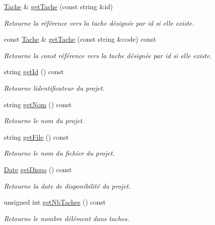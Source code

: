 \begin{DoxyCompactItemize}
\hyperlink{class_tache}{Tache} \& \hyperlink{class_projet_aec4344d230da76d5af9ad269bda21ffe}{get\+Tache} (const string \&id)
\begin{DoxyCompactList}\small\item\em Retourne la référence vers la tache désignée par id si elle existe. \end{DoxyCompactList}\item 
const \hyperlink{class_tache}{Tache} \& \hyperlink{class_projet_a99eedafc1f5a058c2d39f2e244240fa5}{get\+Tache} (const string \&code) const 
\begin{DoxyCompactList}\small\item\em Retourne la const référence vers la tache désignée par id si elle existe. \end{DoxyCompactList}\item 
string \hyperlink{class_projet_abae53a998b1d18ad7c8ea0d7221fc0eb}{get\+Id} () const 
\begin{DoxyCompactList}\small\item\em Retourne l\textquotesingle{}identificateur du projet. \end{DoxyCompactList}\item 
string \hyperlink{class_projet_abc4ef9586bab910e754d4f88943df720}{get\+Nom} () const 
\begin{DoxyCompactList}\small\item\em Retourne le nom du projet. \end{DoxyCompactList}\item 
string \hyperlink{class_projet_a9cc70cd55d62e8a2fc2d286035a599a6}{get\+File} () const 
\begin{DoxyCompactList}\small\item\em Retourne le nom du fichier du projet. \end{DoxyCompactList}\item 
\hyperlink{class_t_i_m_e_1_1_date}{Date} \hyperlink{class_projet_ad217a35a0b15f081ca3c4883bfacef87}{get\+Dispo} () const 
\begin{DoxyCompactList}\small\item\em Retourne la date de disponibilité du projet. \end{DoxyCompactList}\item 
unsigned int \hyperlink{class_projet_acffaba5346f86a0f0e674be256aad55f}{get\+Nb\+Taches} () const 
\begin{DoxyCompactList}\small\item\em Retourne le nombre d\textquotesingle{}élément dans taches. \end{DoxyCompactList}\item 

\end{DoxyCompactItemize}
